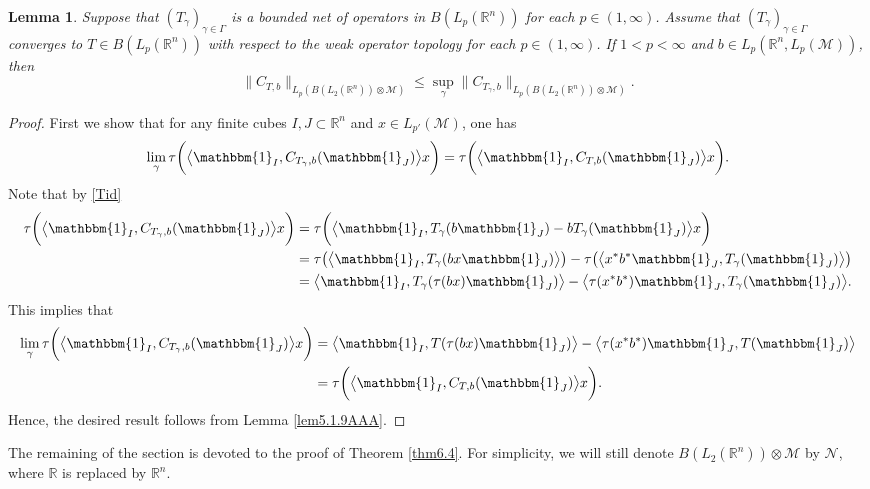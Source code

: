 \documentclass[oneside,english,a4wide]{amsart}
\numberwithin{equation}{section}
\numberwithin{figure}{section}
\theoremstyle{plain}
\theoremstyle{plain}
\theoremstyle{definition}
\theoremstyle{plain}
\newtheorem{lemma}[thm]{Lemma}
\theoremstyle{remark}
\theoremstyle{definition}
\theoremstyle{remark}
\theoremstyle{definition}
\newcommand{\M}{{\mathcal M}}
\newcommand{\8}{\infty}
\newcommand{\la}{\langle}
\newcommand{\ra}{\rangle}
\begin{document}
\begin{lemma}\label{lem5.1.10AAA}
	Suppose that $(T_\gamma)_{\gamma\in \Gamma}$ is a bounded net of operators in $B(L_p(\mathbb{R}^n))$ for each $p\in (1, \8)$. Assume that $(T_\gamma)_{\gamma\in \Gamma}$ converges to $T\in B(L_p(\mathbb{R}^n))$ with respect to the weak operator topology for each $p\in (1, \8)$. If $1< p<\8$ and $b\in L_p(\mathbb{R}^n, L_p(\mathcal{M}))$, then
	$$  \| C_{T, b}\|_{L_p(B(L_2(\mathbb{R}^n))\otimes \mathcal{M})} \leq \sup_\gamma  \| C_{T_\gamma, b}\|_{L_p(B(L_2(\mathbb{R}^n))\otimes \mathcal{M})}. $$
\end{lemma}
\begin{proof}
	First we show that for any finite cubes $I, J\subset \mathbb{R}^n $ and $x\in L_{p'}(\M)$, one has
	$$  \lim_\gamma\tau \bigg( \big\la \mathbbm{1}_I, C_{T_\gamma, b}( \mathbbm{1}_J)\big\ra x \bigg)= \tau \bigg( \big\la \mathbbm{1}_I, C_{T, b}( \mathbbm{1}_J)\big\ra x \bigg). $$
	Note that by \eqref{Tid}
	\begin{equation*}
		\begin{aligned}
			\tau \bigg( \big\la \mathbbm{1}_I, C_{T_\gamma, b}( \mathbbm{1}_J)\big\ra x \bigg)&= \tau \bigg( \big\la \mathbbm{1}_I, T_\gamma( b\mathbbm{1}_J)- bT_\gamma( \mathbbm{1}_J) \big\ra x \bigg)\\
			&= \tau \big( \big\la \mathbbm{1}_I, T_\gamma( bx\mathbbm{1}_J)\big\ra\big)- \tau \big( \big\la x^* b^*\mathbbm{1}_J, T_\gamma( \mathbbm{1}_J) \big\ra \big)\\
			&=\big\la \mathbbm{1}_I, T_\gamma( \tau(bx) \mathbbm{1}_J)\big\ra- \big\la \tau(x^* b^*)\mathbbm{1}_J, T_\gamma( \mathbbm{1}_J) \big\ra.
		\end{aligned}
	\end{equation*}
	This implies that
	\begin{equation*}
		\begin{aligned}
			\lim_\gamma\tau \bigg( \big\la \mathbbm{1}_I, C_{T_\gamma, b}( \mathbbm{1}_J)\big\ra x \bigg)&= \big\la \mathbbm{1}_I, T( \tau(bx) \mathbbm{1}_J)\big\ra- \big\la \tau(x^* b^*)\mathbbm{1}_J, T( \mathbbm{1}_J) \big\ra\\
			& =\tau \bigg( \big\la \mathbbm{1}_I, C_{T, b}( \mathbbm{1}_J)\big\ra x \bigg).
		\end{aligned}
	\end{equation*}
	Hence, the desired result follows from Lemma \ref{lem5.1.9AAA}.
\end{proof}


The remaining of the section is devoted to the proof of Theorem \ref{thm6.4}. For simplicity, we will still denote $B(L_2(\mathbb{R}^n))\otimes \mathcal{M}$ by $\mathcal{N}$, where $\mathbb{R}$ is replaced by $\mathbb{R}^n$.
\end{document}
